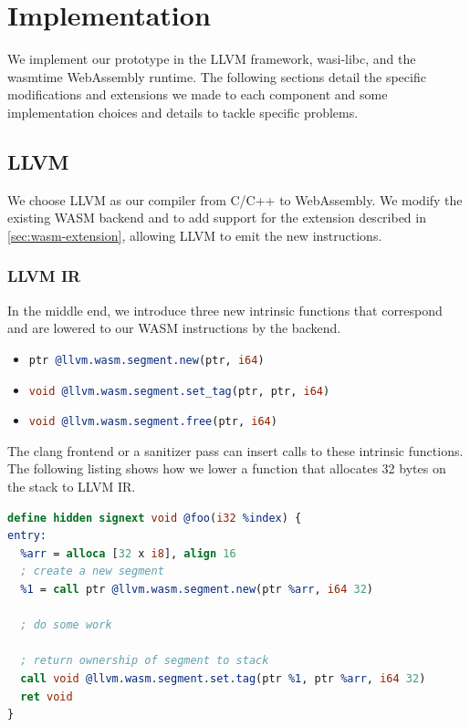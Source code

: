\chapter{Implementation}
\label{ch:implementation}

We implement our prototype in the LLVM framework, wasi-libc, and the wasmtime WebAssembly runtime.
The following sections detail the specific modifications and extensions we made to each component and some implementation choices and details to tackle specific problems.

\section{LLVM}
\label{sec:llvm}

We choose LLVM as our compiler from C/C++ to WebAssembly.
We modify the existing \ac{WASM} backend and to add support for the extension described in \cref{sec:wasm-extension}, allowing LLVM to emit the new instructions.

\subsection{LLVM IR}
\label{subsec:llvm-ir}

In the middle end, we introduce three new intrinsic functions that correspond and are lowered to our \ac{WASM} instructions by the backend.

\begin{itemize}
  \item \lstinline[style=customc,language=llvm]{ptr @llvm.wasm.segment.new(ptr, i64)}
  \item \lstinline[style=customc,language=llvm]{void @llvm.wasm.segment.set_tag(ptr, ptr, i64)}
  \item \lstinline[style=customc,language=llvm]{void @llvm.wasm.segment.free(ptr, i64)}
\end{itemize}

The clang frontend or a sanitizer pass can insert calls to these intrinsic functions.
The following listing shows how we lower a function that allocates 32 bytes on the stack to LLVM IR.

\begin{lstlisting}[frame=h,style=customc,
  label={lst:llvm-intrinsics},language=llvm]
define hidden signext void @foo(i32 %index) {
entry:
  %arr = alloca [32 x i8], align 16
  ; create a new segment
  %1 = call ptr @llvm.wasm.segment.new(ptr %arr, i64 32)

  ; do some work

  ; return ownership of segment to stack
  call void @llvm.wasm.segment.set.tag(ptr %1, ptr %arr, i64 32)
  ret void
}
\end{lstlisting}


